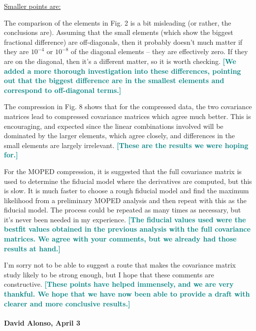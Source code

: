 \documentclass{article}
\newcommand\reply[1]{{\bf {\textcolor{teal}{[#1]}}}}
\begin{document}
	\underline{Smaller points are:}
	
	The comparison of the elements in Fig. 2 is a bit misleading (or rather, the conclusions are).  Assuming that the small elements (which show the biggest fractional difference) are off-diagonals, then it probably doesn’t much matter if they are $10^{-4}$ or $10^{-8}$ of the diagonal elements – they are effectively zero.  If they are on the diagonal, then it’s a different matter, so it is worth checking. \reply{We added a more thorough investigation into these differences, pointing out that the biggest difference are in the smallest elements and correspond to off-diagonal terms.}
	
	The compression in Fig. 8 shows that for the compressed data, the two covariance matrices lead to compressed covariance matrices which agree much better.  This is encouraging, and expected since the linear combinations involved will be dominated by the larger elements, which agree closely, and differences in the small elements are largely irrelevant. \reply{These are the results we were hoping for.}
	
	For the MOPED compression, it is suggested that the full covariance matrix is used to determine the fiducial model where the derivatives are computed, but this is slow. It is much faster to choose a rough fiducial model and find the maximum likelihood from a preliminary MOPED analysis and then repeat with this as the fiducial model.  The process could be repeated as many times as necessary, but it’s never been needed in my experience. \reply{The fiducial values used were the bestfit values obtained in the previous analysis with the full covariance matrices. We agree with your comments, but we already had those results at hand.}
	
	I’m sorry not to be able to suggest a route that makes the covariance matrix study likely to be strong enough, but I hope that these comments are constructive. \reply{These points have helped immensely, and we are very thankful. We hope that we have now been able to provide a draft with clearer and more conclusive results.}\\  \\
	
	
	\textbf{David Alonso, April 3} \\
	
\end{document}
